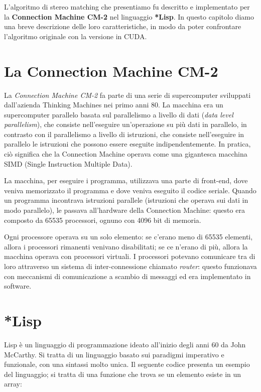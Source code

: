 \documentclass[12pt,a4paper,openright,twoside]{report}
\begin{document}
L'algoritmo di stereo matching che presentiamo fu descritto e implementato per la \textbf{Connection Machine CM-2} nel linguaggio \textbf{*Lisp}. In questo capitolo diamo una breve descrizione delle loro caratteristiche, in modo da poter confrontare l'algoritmo originale con la versione in CUDA.

\section{La Connection Machine CM-2}

La \textit{Connection Machine CM-2} fa parte di una serie di supercomputer sviluppati dall'azienda Thinking Machines nei primo anni 80. La macchina era un supercomputer parallelo basata sul parallelismo a livello di dati (\textit{data level parallelism}), che consiste nell'eseguire un'operazione su più dati in parallelo, in contrasto con il parallelismo a livello di istruzioni, che consiste nell'eseguire in parallelo le istruzioni che possono essere eseguite indipendentemente. In pratica, ciò significa che la Connection Machine operava come una gigantesca macchina SIMD (Single Instruction Multiple Data).

La macchina, per eseguire i programma, utilizzava una parte di front-end, dove veniva memorizzato il programma e dove veniva eseguito il codice seriale. Quando un programma incontrava istruzioni parallele (istruzioni che operava sui dati in modo parallelo), le passava all'hardware della Connection Machine: questo era composto da 65535 processori, ognuno con 4096 bit di memoria.

Ogni processore operava su un solo elemento: se c'erano meno di 65535 elementi, allora i processori rimanenti venivano disabilitati; se ce n'erano di più, allora la macchina operava con processori virtuali. I processori potevano comunicare tra di loro attraverso un sistema di inter-connessione chiamato \textit{router}: questo funzionava con meccanismi di comunicazione a scambio di messaggi ed era implementato in software.

\section{*Lisp}

Lisp è un linguaggio di programmazione ideato all'inizio degli anni 60 da John McCarthy. Si tratta di un linguaggio basato sui paradigmi imperativo e funzionale, con una sintassi molto unica. Il seguente codice presenta un esempio del linguaggio; si tratta di una funzione che trova se un elemento esiste in un array:
\end{document}
